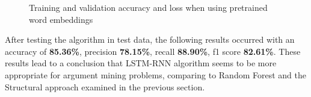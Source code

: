 \begin{figure}[H]
	\centering
	\qquad
	\caption{
		Training and validation accuracy and loss when using pretrained word embeddings
	}
	\label{fig:example}
\end{figure}

After testing the algorithm in test data, the following results occurred with an accuracy of \textbf{85.36\%}, precision \textbf{78.15\%}, recall \textbf{88.90\%}, f1 score \textbf{82.61\%}. These results lead to a conclusion that LSTM-RNN algorithm seems to be more appropriate for argument mining problems, comparing to Random Forest and the Structural approach examined in the previous section.

